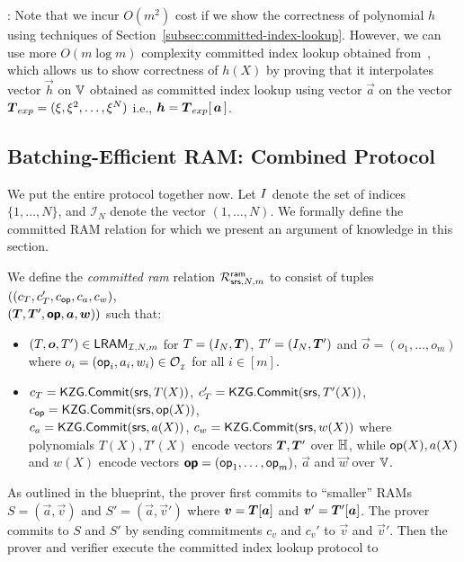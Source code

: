 : Note that we incur $O(m^2)$ cost if we show the correctness of polynomial $h$ using techniques of Section~\ref{subsec:committed-index-lookup}.
However, we can use more $O(m\log m)$ complexity committed index lookup obtained from~\cite{EPRINT:EagFioGab22}, which allows us to show correctness of
$h(X)$ by proving that it interpolates vector $\vec{h}$ on $\mathbb{V}$ obtained as committed index lookup using vector $\vec{a}$ on the vector $\vecT_{exp}=(\xi,\xi^2,\ldots,\xi^N)$
i.e., $\vec{h}=\vecT_{exp}[\, \vec{a}\,]$.

\subsection{Batching-Efficient RAM: Combined Protocol}\label{subsec:all-together}
We put the entire protocol together now. Let $I$ denote the set of indices $\{1,\ldots,N\}$, and $\mathcal{I}_N$
denote the vector $(1,\ldots,N)$. We formally define the committed RAM relation for which we present an argument of
knowledge in this section.
\begin{definition}\label{defn:committed-ram}
We define the {\em committed ram} relation
$\mathcal{R}^{\mathsf{ram}}_{\mathsf{srs},N,m}$ to consist of tuples $((c_T, c_T', c_{\mathsf{op}}, c_a, c_w)$, \\
$(\vecT, \vecT',\vec{\op},\vec{a},\vec{w}))$
such that:
\begin{itemize}[leftmargin=1em]
    \item $(T,\vec{o},T')\in \LRAM{I}{N}{m}$ for $T=(\setind_N,\vecT)$, $T'=(\setind_N,\vecT')$ and $\vec{o}=(o_1,\ldots,o_m)$
    where $o_i=(\mathsf{op}_i, a_i, w_i)\in \mathcal{O}_{{}_\mathcal{I}}$ for all $i\in [m]$.
    \item $c_T=\mathsf{KZG.Commit}(\mathsf{srs}, T(X))$, $c_T'=\mathsf{KZG.Commit}(\mathsf{srs}, T'(X))$, $c_{\mathsf{op}} = \mathsf{KZG.Commit}(\mathsf{srs},\mathsf{op}(X))$,  \\
    $c_a=\mathsf{KZG.Commit}(\mathsf{srs}, a(X))$, $c_w = \mathsf{KZG.Commit}(\mathsf{srs}, w(X))$ where polynomials $T(X), T'(X)$ encode vectors $\vecT, \vecT'$ over $\mathbb{H}$, while $\mathsf{op}(X), a(X)$ and
    $w(X)$ encode vectors $\vec{\op}=(\op_1,\ldots,\op_m)$, $\vec{a}$ and $\vec{w}$ over $\mathbb{V}$.
\end{itemize}
\end{definition}
As outlined in the blueprint, the prover first commits to ``smaller'' RAMs $S=(\vec{a},\vec{v})$ and $S'=(\vec{a},\vec{v}')$
where $\vec{v}=\vecT[\vec{a}]$ and $\vec{v}'=\vecT'[\vec{a}]$. The prover commits to $S$ and $S'$ by sending commitments
$c_v$ and $c_v'$ to $\vec{v}$ and $\vec{v}'$. Then the prover and verifier execute the committed index lookup protocol to
